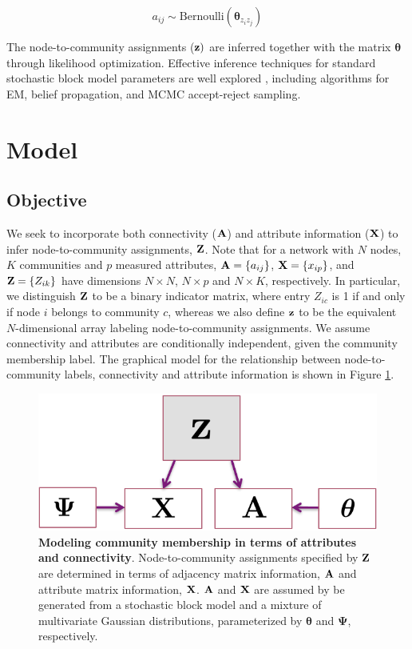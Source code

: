 \begin{equation}
a_{ij} \sim \text{Bernoulli}(\boldsymbol \theta_{z_{i}z_{j}})
\end{equation}

The node-to-community assignments (${\bf z})$ are inferred together with the matrix ${\boldsymbol \theta}$ through likelihood optimization. Effective inference techniques for standard stochastic block model parameters are well explored \cite{comparative,tiagomcmc,dudin}, including algorithms for EM, belief propagation, and MCMC accept-reject sampling. 

\section{Model}
\subsection{Objective}
We seek to incorporate both connectivity (${\bf A}$) and attribute information (${\bf X}$) to infer node-to-community assignments, ${\bf Z}$. Note that for a network with $N$ nodes, $K$ communities and $p$ measured attributes, ${\bf A}=\{a_{ij}\}$, ${\bf X}=\{x_{ip}\}$, and ${\bf Z}=
\{Z_{ik}\}$ have dimensions $N \times N$, $N \times p$ and $N \times K$, respectively. In particular, we distinguish ${\bf Z}$ to be a binary indicator matrix, where entry $Z_{ic}$ is 1 if and only if node $i$ belongs to community $c$, whereas we also define ${\bf z}$ to be the equivalent $N$-dimensional array labeling node-to-community assignments. We assume connectivity and attributes are conditionally independent, given the community membership label. The graphical model for the relationship between node-to-community labels, connectivity and attribute information is shown in Figure \ref{fig:graphical_model}.

\begin{figure}
\begin{center}
\includegraphics[scale=.75]{GraphModel.pdf}
\caption{{\bf Modeling community membership in terms of attributes and connectivity}. Node-to-community assignments specified by ${\bf Z}$ are determined in terms of adjacency matrix information, ${\bf A}$ and attribute matrix information, ${\bf X}$. ${\bf A}$ and ${\bf X}$ are assumed by be generated from a stochastic block model and a mixture of multivariate Gaussian distributions, parameterized by ${\boldsymbol \theta}$ and ${\boldsymbol \Psi}$, respectively.
\label{fig:graphical_model}} 
\end{center}
\end{figure}

